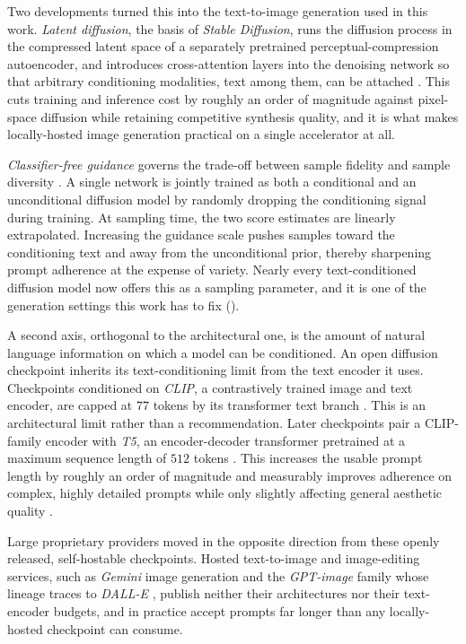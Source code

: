 Two developments turned this into the text-to-image generation used in this work. \textit{Latent diffusion}, the basis of \textit{Stable Diffusion}, runs the diffusion process in the compressed latent space of a separately pretrained perceptual-compression autoencoder, and introduces cross-attention layers into the denoising network so that arbitrary conditioning modalities, text among them, can be attached \cite{rombachHighResolutionImageSynthesis2022}. This cuts training and inference cost by roughly an order of magnitude against pixel-space diffusion while retaining competitive synthesis quality, and it is what makes locally-hosted image generation practical on a single accelerator at all.

\textit{Classifier-free guidance} governs the trade-off between sample fidelity and sample diversity \cite{hoClassifierFreeDiffusionGuidance2022}. A single network is jointly trained as both a conditional and an unconditional diffusion model by randomly dropping the conditioning signal during training. At sampling time, the two score estimates are linearly extrapolated. Increasing the guidance scale pushes samples toward the conditioning text and away from the unconditional prior, thereby sharpening prompt adherence at the expense of variety. Nearly every text-conditioned diffusion model now offers this as a sampling parameter, and it is one of the generation settings this work has to fix ().

A second axis, orthogonal to the architectural one, is the amount of natural language information on which a model can be conditioned. An open diffusion checkpoint inherits its text-conditioning limit from the text encoder it uses. Checkpoints conditioned on \textit{CLIP}, a contrastively trained image and text encoder, are capped at $77$ tokens by its transformer text branch \cite{radfordLearningTransferableVisual2021}. This is an architectural limit rather than a recommendation. Later checkpoints pair a CLIP-family encoder with \textit{T5}, an encoder-decoder transformer pretrained at a maximum sequence length of $512$ tokens \cite{raffelExploringLimitsTransfer2023}. This increases the usable prompt length by roughly an order of magnitude and measurably improves adherence on complex, highly detailed prompts while only slightly affecting general aesthetic quality \cite{esserScalingRectifiedFlow2024}.

Large proprietary providers moved in the opposite direction from these openly released, self-hostable checkpoints. Hosted text-to-image and image-editing services, such as \textit{Gemini} image generation and the \textit{GPT-image} family whose lineage traces to \textit{DALL-E} \cite{openaiDALLECreatingImages2021}, publish neither their architectures nor their text-encoder budgets, and in practice accept prompts far longer than any locally-hosted checkpoint can consume.

